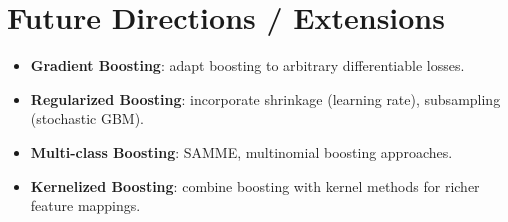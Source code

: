 \documentclass[11pt]{article}
\begin{document}
\section{Future Directions / Extensions}
\begin{itemize}
  \item \textbf{Gradient Boosting}: adapt boosting to arbitrary differentiable losses.
  \item \textbf{Regularized Boosting}: incorporate shrinkage (learning rate), subsampling (stochastic GBM).
  \item \textbf{Multi-class Boosting}: SAMME, multinomial boosting approaches.
  \item \textbf{Kernelized Boosting}: combine boosting with kernel methods for richer feature mappings.
\end{itemize}
\end{document}
